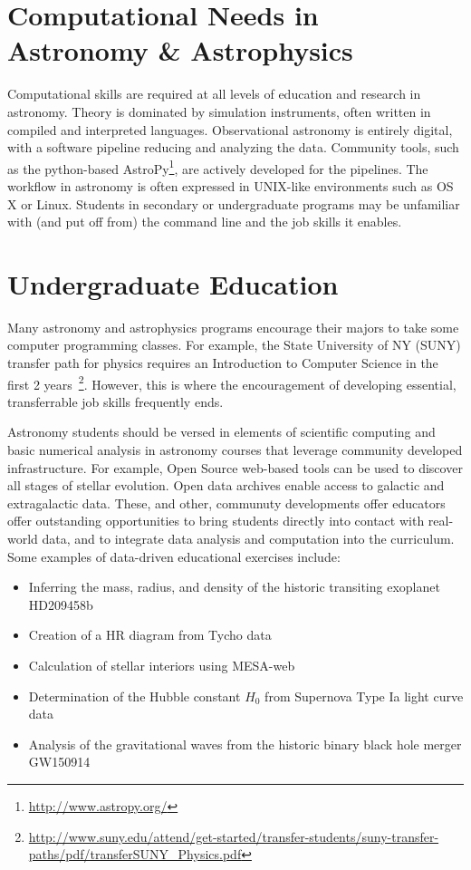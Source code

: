\documentclass[11pt]{article}
\newenvironment{squishlist}                                                     
  {\begin{itemize}                                                              
    \addtolength{\itemsep}{-0.33\baselineskip}                                  
   }                                                                            
  { \end{itemize} }
\begin{document}
\section{Computational Needs in Astronomy \& Astrophysics}

Computational skills are required at all levels of education
and research in astronomy.  Theory is dominated by simulation instruments, 
often written in compiled and interpreted languages. 
Observational astronomy is entirely digital, with 
a software pipeline reducing and analyzing the data.  Community tools, such as the python-based
AstroPy\footnote{\url{http://www.astropy.org/}}, are actively developed for the pipelines.
The workflow in astronomy is often expressed in UNIX-like environments such as  OS X or Linux.
Students in secondary or undergraduate programs may be unfamiliar with
(and put off from) the command line and the job skills it enables.

\section{Undergraduate Education}

Many astronomy and astrophysics programs encourage their majors to
take some computer programming classes.  For example, the State
University of NY (SUNY) transfer path for physics requires an Introduction to Computer Science 
in the first 2
years~\footnote{\url{http://www.suny.edu/attend/get-started/transfer-students/suny-transfer-paths/pdf/transferSUNY_Physics.pdf}\hfill}.
However, this is where the encouragement of developing essential, transferrable job skills frequently ends. 

Astronomy students should be versed in elements of scientific computing and
basic numerical analysis in astronomy courses that leverage
community developed infrastructure. For example, Open Source web-based tools can 
be used to discover all stages of stellar evolution. Open data archives enable access to
galactic and extragalactic data.  These, and other, communuty
developments offer educators offer outstanding opportunities to bring
students directly into contact with real-world data, and to integrate
data analysis and computation into the curriculum. Some examples of
data-driven educational exercises include:
\begin {squishlist}
\item Inferring the mass, radius, and density of the historic transiting exoplanet HD209458b
\item Creation of a HR diagram from Tycho data
\item Calculation of stellar interiors using MESA-web
\item Determination of the Hubble constant $H_0$ from Supernova Type Ia light curve data
\item Analysis of the gravitational waves from the historic binary black hole merger GW150914
\end {squishlist}
\end{document}
